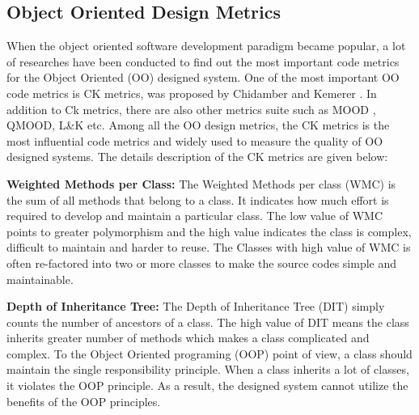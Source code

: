 \documentclass[12pt]{report}
\begin{document}

\subsection{Object Oriented Design Metrics}
\label{Code_Metrics_background_study}
When the object oriented software development paradigm became popular, a lot of researches have been conducted to find out the most important code metrics for the Object Oriented (OO) designed system. One of the most important OO code metrics is CK metrics, was proposed by Chidamber and Kemerer \cite{chidamber1994metrics}. In addition to Ck metrics, there are also other metrics suite such as MOOD \cite{bansiya2002hierarchical}, QMOOD, L\&K etc. Among all the OO design metrics, the CK metrics is the most influential code metrics and widely used to measure the quality of OO designed systems. The details description of the CK metrics are given below:

\textbf{Weighted Methods per Class:}
The Weighted Methods per class (WMC) is the sum of all methods that belong to a class. It indicates how much effort is required to develop and maintain a particular class. The low value of WMC points to greater polymorphism and the high value indicates the class is complex, difficult to maintain and harder to reuse. The Classes with high value of WMC is often re-factored into two or more classes to make the source codes simple and maintainable.

\textbf{Depth of Inheritance Tree:}
The Depth of Inheritance Tree (DIT) simply counts the number of ancestors of a class. The high value of DIT means the class inherits greater number of methods which makes a class complicated and complex. To the Object Oriented programing (OOP) point of view, a class should maintain the single responsibility principle. When a class inherits a lot of classes, it violates the OOP principle. As a result, the designed system cannot utilize the benefits of the OOP principles. 
\end{document}
